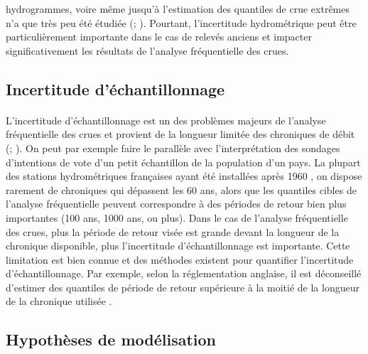 \documentclass[11pt]{article}
\begin{document}
hydrogrammes, voire même jusqu'à l'estimation des quantiles de crue extrêmes n'a que très peu été étudiée (\cite{horner_impact_2018}; \cite{steinbakk_propagation_2016}). Pourtant, l'incertitude hydrométrique peut être particulièrement importante dans le cas de relevés anciens et impacter significativement les résultats de l'analyse fréquentielle des crues.
	
	\subsection{Incertitude d'échantillonnage}
	
	\paragraph{} L'incertitude d'échantillonnage est un des problèmes majeurs de l'analyse fréquentielle des crues et provient de la longueur limitée des chroniques de débit (\citet{apel_flood_2004}; \citet{kjeldsen_uncertainty_2011}). On peut par exemple faire le parallèle avec l'interprétation des sondages d'intentions de vote d'un petit échantillon de la population d'un pays. La plupart des stations hydrométriques françaises ayant été installées après 1960 \citep{le_coz_quantifying_2017}, on dispose rarement de chroniques qui dépassent les 60 ans, alors que les quantiles cibles de l'analyse fréquentielle peuvent correspondre à des périodes de retour bien plus importantes (100 ans, 1000 ans, ou plus). Dans le cas de l'analyse fréquentielle des crues, plus la période de retour visée est grande devant la longueur de la chronique disponible, plus l'incertitude d'échantillonnage est importante. Cette limitation est bien connue et des méthodes existent pour quantifier l'incertitude d'échantillonnage. Par exemple, selon la réglementation anglaise, il est déconseillé d'estimer des quantiles de période de retour supérieure à la moitié de la longueur de la chronique utilisée \citep{whs_flood_2008}.
	
	\subsection{Hypothèses de modélisation}
		
\end{document}
